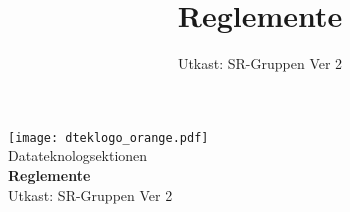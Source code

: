 \documentclass[a4paper]{dtek}
\title{Reglemente}
\date{Utkast: SR-Gruppen Ver 2}
\begin{document}
\begin{titlepage}
  \thispagestyle{empty} %
  \vspace*{\fill}
  \begin{center}
    \texttt{[image: dteklogo\_orange.pdf]}\\[3em]
    {\Huge Datateknologsektionen}\\[3em]
    {\Huge \textbf{Reglemente}}\\[1em]
    Utkast: SR-Gruppen Ver 2\\[20em]
  \end{center}
  \vspace*{\fill}
\end{titlepage}

\makeheadfoot

\setcounter{tocdepth}{2}
\tableofcontents
\end{document}
